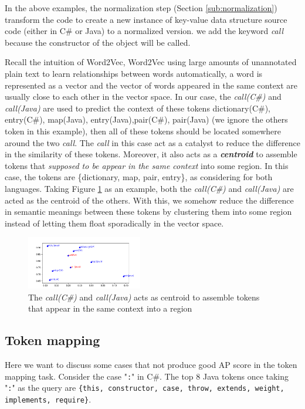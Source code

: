 In the above examples, the normalization step (Section \ref{sub:normalization}) transform the code to create a new instance of key-value data structure source code (either in C\# or Java) to a normalized version. we add the keyword \textit{call} because the constructor of the object will be called.

Recall the intuition of Word2Vec, Word2Vec using large amounts of unannotated plain text to learn relationships between words automatically, a word is represented as a vector and the vector of words appeared in the same context are usually close to each other in the vector space. In our case, the \textit{call(C\#)} and \textit{call(Java)} are used to predict the context of these tokens {dictionary(C\#), entry(C\#), map(Java), entry(Java),pair(C\#), pair(Java)} (we ignore the others token in this example), then all of these tokens should be located somewhere around the two \textit{call}. The \textit{call} in this case act as a catalyst to reduce the difference in the similarity of these tokens. Moreover, it also acts as a \textit{\textbf{centroid}} to assemble tokens that \textit{supposed to be appear in the same context} into some region. In this case, the tokens are \{dictionary, map, pair, entry\}, as considering for both languages. Taking Figure \ref{fig:mapping_explain} as an example, both the \textit{call(C\#)} and \textit{call(Java)} are acted as the centroid of the others. With this, we somehow reduce the difference in semantic meanings between these tokens by clustering them into some region instead of letting them float sporadically in the vector space.
\begin{figure}[t!]
	\includegraphics[width=0.45\textwidth]{mapping_explain}
	
	\caption{The \textit{call(C\#)} and \textit{call(Java)} acts as centroid to assemble tokens that appear in the same context into a region}
	\label{fig:mapping_explain}
	\medskip
\end{figure}

\subsection{Token mapping}
Here we want to discuss some cases that not produce good AP score in the token mapping task. Consider the case "\texttt{:}" in C\#. The top 8 Java tokens once taking "\texttt{:}" as the query are \texttt{\{this, constructor, case, throw, extends, weight, implements, require\}}. 

